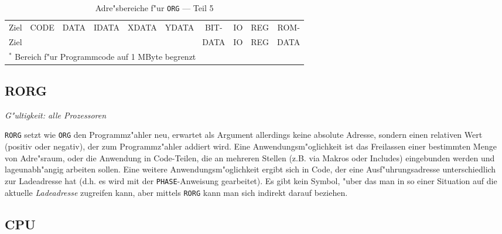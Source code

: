 \documentclass[12pt,a4paper,twoside]{report}
\makeatletter
\newcommand{\tty}[1]{{\tt #1}}
\newcommand{\tin}[1]{{\scriptsize #1}}
\newcommand{\ttindex}[1]{\index{#1@{\tt #1}}}
\makeatother
\begin{document}
\clearpage
\begin{table*}[htbp]
\begin{center}\begin{tabular}{|l|c|c|c|c|c|c|c|c|c|}
\hline
\tin{Ziel} & \tin{CODE} & \tin{DATA} & \tin{IDATA} & \tin{XDATA} & \tin{YDATA} & \tin{BIT-} & \tin{IO} & \tin{REG} & \tin{ROM-} \\
\tin{Ziel} &            &            &             &             &             & \tin{DATA} & \tin{IO} & \tin{REG} & \tin{DATA} \\
\hline
\hline

\hline
\multicolumn{10}{|l|}{$^{*}$ Bereich f"ur Programmcode auf 1 MByte
begrenzt} \\
\hline
\end{tabular}\end{center}
\caption{Adre"sbereiche f"ur \tty{ORG} --- Teil 5\label{TabORG5}}
\end{table*}


\subsection{RORG}
\label{SectRORG}
\ttindex{RORG}

{\em G"ultigkeit: alle Prozessoren}

\tty{RORG} setzt wie \tty{ORG} den Programmz"ahler neu, erwartet
als Argument allerdings keine absolute Adresse, sondern einen
relativen Wert (positiv oder negativ), der zum Programmz"ahler
addiert wird.  Eine Anwendungsm"oglichkeit ist das Freilassen
einer bestimmten Menge von Adre"sraum, oder die Anwendung in
Code-Teilen, die an mehreren Stellen (z.B. via Makros oder
Includes) eingebunden werden und lageunabh"angig arbeiten sollen.
Eine weitere Anwendungsm"oglichkeit ergibt sich in Code, der eine
Ausf"uhrungsadresse unterschiedlich zur Ladeadresse hat (d.h. es
wird mit der \tty{PHASE}-Anweisung gearbeitet).  Es gibt kein
Symbol, "uber das man in so einer Situation auf die aktuelle
{\em Ladeadresse} zugreifen kann, aber mittels \tty{RORG} kann man
sich indirekt darauf beziehen.


\subsection{CPU}
\ttindex{CPU}
\end{document}
